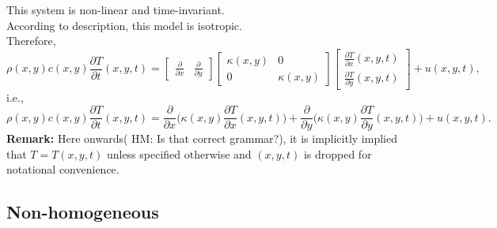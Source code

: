 \documentclass[12pt]{article}
\newcommand{\HM}[1]{{\color{green} HM: #1}}
\newcommand{\parder}[2]{\frac{\partial #1}{\partial #2}}
\begin{document}
This system is non-linear and time-invariant.\\
According to description, this model is isotropic.\\ Therefore,
\begin{equation}
\rho (x,y)c(x,y)\parder{T}{t}(x,y,t)=
\begin{bmatrix}
\parder{ }{x} & \parder{ }{y}
\end{bmatrix}
\begin{bmatrix}
\kappa(x,y) & 0\\
0 & \kappa(x,y) 
\end{bmatrix}
\begin{bmatrix}
\parder{T}{x}(x,y,t)\\
\parder{T}{y}(x,y,t)
\end{bmatrix}
+u(x,y,t),
\label{eqn:main_prob1}
\end{equation}
i.e.,
\begin{equation}
\rho (x,y)c(x,y)\parder{T}{t}(x,y,t)= \parder{ }{x}\bigg(\kappa(x,y)\parder{T}{x} (x,y,t)\bigg) + \parder{ }{y}\bigg(\kappa(x,y)\parder{T}{y} (x,y,t)\bigg)+u(x,y,t).
\label{eqn:simplified_prob1}
\end{equation}
\textbf{Remark:} Here onwards(\HM{Is that correct grammar?}), it is implicitly implied that $T = T(x,y,t)$ unless specified otherwise and $(x,y,t)$ is dropped for notational convenience.
\subsection*{Non-homogeneous} 
\end{document}
